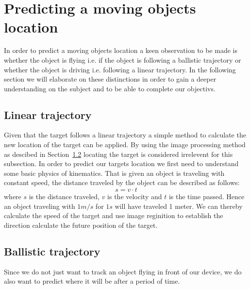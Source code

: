 \section{Predicting a moving objects location}
In order to predict a moving objects location a keen observation to be made is whether the object is flying i.e. if the object is following a ballistic trajectory or whether the object is driving i.e. following a linear trajectory. 
In the following section we will elaborate on these distinctions in order to gain a deeper understanding on the subject and to be able to complete our objectivs. 
\subsection{Linear trajectory}
Given that the target follows a linear trajectory a simple method to calculate the new location of the target can be applied. 
By using the image processing method as descibed in Section~\ref{} locating the target is considered irrelevent for this subsection. 
In order to predict our targets location we first need to understand some basic physics of kinematics. 
That is given an object is traveling with constant speed, the distance traveled by the object can be described as follows:
\begin{equation}
s = v \cdot t
\end{equation}
where $ s $ is the distance traveled, $ v $ is the velocity and $ t $ is the time passed.
Hence an object traveling with $ 1 m/s $ for $ 1 s $ will have traveled 1 meter. 
We can thereby calculate the speed of the target and use image reginition to establish the direction calculate the future position of the target. 


\subsection{Ballistic trajectory}
Since we do not just want to track an object flying in front of our device, we do also want to predict where it will be after a period of time. 
